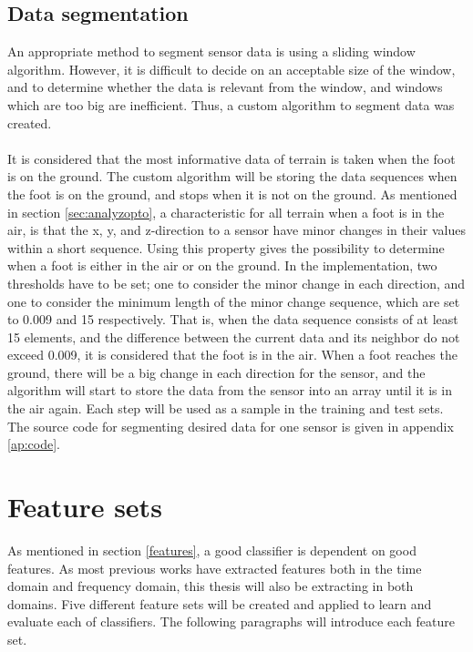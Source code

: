 \documentclass[USenglish]{ifimaster}  %
\begin{document}
\subsection{Data segmentation} \label{subseq:segmentation}
An appropriate method to segment sensor data is using a sliding window algorithm. However, it is difficult to decide on an acceptable size of the window, and to determine whether the data is relevant from the window, and windows which are too big are inefficient. Thus, a custom algorithm to segment data was created. 
\\
\\
It is considered that the most informative data of terrain is taken when the foot is on the ground. The custom algorithm will be storing the data sequences when the foot is on the ground, and stops when it is not on the ground. As mentioned in section \ref{sec:analyzopto}, a characteristic for all terrain when a foot is in the air, is that the x, y, and z-direction to a sensor have minor changes in their values within a short sequence. Using this property gives the possibility to determine when a foot is either in the air or on the ground. In the implementation, two thresholds have to be set; one to consider the minor change in each direction, and one to consider the minimum length of the minor change sequence, which are set to 0.009 and 15 respectively. That is, when the data sequence consists of at least 15 elements, and the difference between the current data and its neighbor do not exceed 0.009, it is considered that the foot is in the air. When a foot reaches the ground, there will be a big change in each direction for the sensor, and the algorithm will start to store the data from the sensor into an array until it is in the air again. Each step will be used as a sample in the training and test sets. The source code for segmenting desired data for one sensor is given in appendix \ref{ap:code}.

\section{Feature sets}\label{sec:featuresets}
As mentioned in section \ref{features}, a good classifier is dependent on good features. As most previous works have extracted features both in the time domain and frequency domain, this thesis will also be extracting in both domains. Five different feature sets will be created and applied to learn and evaluate each of classifiers. The following paragraphs will introduce each feature set. 
\end{document}
